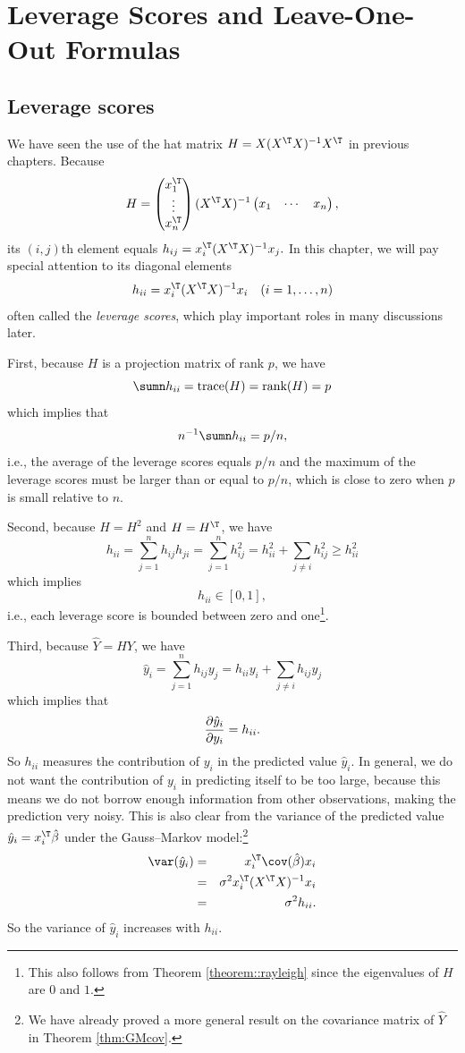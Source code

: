  
\chapter{Leverage Scores and Leave-One-Out Formulas}\label{chapter::leave-one-out}
 
\section{Leverage scores}

We have seen the use of the hat matrix  $H=X(X^{\T}X)^{-1}X^{\T} $ in previous chapters. Because 
$$
H 
 = \begin{pmatrix}
x_1^{\T} \\
\vdots \\
x_{n}^{\T}
\end{pmatrix} 
(X^{\T}X)^{-1} 
\begin{pmatrix}
x_1& \cdots & x_n
\end{pmatrix},
$$
its $(i,j)$th element equals $h_{ij}=x_{i}^{\T}(X^{\T}X)^{-1}x_{j}  .$
In this chapter, we will pay special attention
to its diagonal elements 
\[
h_{ii}=x_{i}^{\T}(X^{\T}X)^{-1}x_{i}  \quad (i= 1, \ldots, n)
\]
 often called the {\it leverage scores}, which play important roles in many
discussions later. 

First, because $H$ is a projection matrix of rank $p$, we have
\[
\sumn h_{ii}=\text{trace}(H)=\text{rank}(H)=p
\]
which implies that
\[
n^{-1}\sumn h_{ii}=p/n, 
\]
i.e., the average of the leverage scores equals $p/n$ and the maximum of the leverage scores must be larger than or equal to $p/n$, which is close
to zero when $p$ is small relative to $n$. 

Second, because $H=H^{2}$ and $H=H^{\T}$, we have
$$
h_{ii}=\sum_{j=1}^{n}h_{ij}h_{ji}=\sum_{j=1}^{n}h_{ij}^{2}=h_{ii}^{2}+\sum_{j\neq i}h_{ij}^{2}\geq h_{ii}^2 
$$
which implies 
$$
h_{ii}\in[0,1] , 
$$ 
i.e., each leverage score is bounded between zero and one\footnote{This also follows from Theorem \ref{theorem::rayleigh} since the eigenvalues of $H$ are $0$ and $1$.}. 

Third, because $\hat{Y}=HY$, we have
\[
\hat{y}_{i}=\sum_{j=1}^{n}h_{ij}y_{j}=h_{ii}y_{i}+\sum_{j\neq i}h_{ij}y_{j}\]
which implies that
\[
\frac{\text{\ensuremath{\partial\hat{y}_{i}}}}{\partial y_{i}}=h_{ii}.
\]
So $h_{ii}$ measures the contribution of $y_{i}$ in the predicted
value $\hat{y}_{i}.$ In general, we do not want the contribution
of $y_{i}$ in predicting itself to be too large, because this means
we do not borrow enough information from other observations, making
the prediction very noisy. This is also clear from the variance of the predicted value 
$\hat{y}_{i}=x_{i}^{\T}\hat{\beta}$ under the Gauss--Markov model:\footnote{We have already proved a more general result on the covariance matrix of $\hat{Y}$ in Theorem \ref{thm:GMcov}.}
\begin{eqnarray*}
\text{\var}(\hat{y}_{i}) 
&=& x_{i}^{\T}\cov(\hat{\beta})x_{i} \\
&=&\sigma^{2}x_{i}^{\T}(X^{\T}X)^{-1}x_{i} \\
&=&\sigma^{2}h_{ii}.
\end{eqnarray*}
So the variance of $\hat{y}_{i}$ increases with $h_{ii}$.


